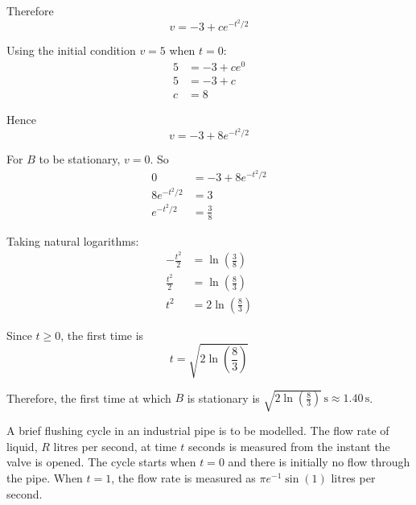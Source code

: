 \documentclass[leqno]{article}
\begin{document}
\begin{enumerate}[
  label=\textbf{\arabic*.},
  leftmargin=*,
  topsep=0pt,
  partopsep=0pt,
  parsep=0pt
]
\begin{djsSolution}
\begin{enumerate}[label=\textbf{(\alph*)}]
  Therefore
  \[
  v=-3+ce^{-t^2/2}
  \]

  Using the initial condition $v=5$ when $t=0$:
  \begin{align*}
  5&=-3+ce^{0} \\
  5&=-3+c \\
  c&=8
  \end{align*}

  Hence
  \[
  v=-3+8e^{-t^2/2}
  \]

  For $B$ to be stationary, $v=0$. So
  \begin{align*}
  0&=-3+8e^{-t^2/2} \\
  8e^{-t^2/2}&=3 \\
  e^{-t^2/2}&=\frac{3}{8}
  \end{align*}

  Taking natural logarithms:
  \begin{align*}
  -\frac{t^2}{2}&=\ln\left(\frac{3}{8}\right) \\
  \frac{t^2}{2}&=\ln\left(\frac{8}{3}\right) \\
  t^2&=2\ln\left(\frac{8}{3}\right)
  \end{align*}

  Since $t\ge 0$, the first time is
  \[
  t=\sqrt{2\ln\left(\frac{8}{3}\right)}
  \]

  Therefore, the first time at which $B$ is stationary is $\sqrt{2\ln\left(\frac{8}{3}\right)}\,\mathrm{s}\approx 1.40\,\mathrm{s}$.
\end{enumerate}
\end{djsSolution}


\newpage

\questionitem

A brief flushing cycle in an industrial pipe is to be modelled. The flow rate of liquid, $R$ litres per second, at time $t$ seconds is measured from the instant the valve is opened. The cycle starts when $t=0$ and there is initially no flow through the pipe. When $t=1$, the flow rate is measured as $\pi e^{-1}\sin (1)$ litres per second. \\


\end{enumerate}
\end{document}
